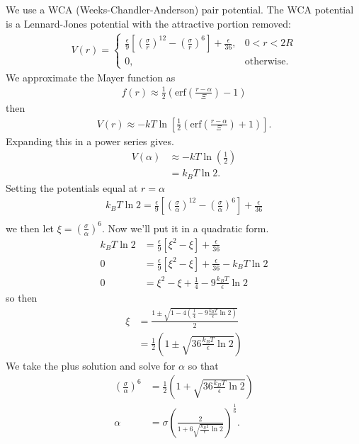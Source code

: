 \documentclass[letterpaper,twocolumn,amsmath,amssymb,prb]{revtex4-1}
\begin{document}
We use a WCA (Weeks-Chandler-Anderson) pair potential. The WCA
potential is a Lennard-Jones potential with the attractive portion removed:
\begin{align}
  V(r) =
  \begin{cases}
    \frac{\epsilon}{9} \left[ \left(\frac{\sigma}{r}\right)^{12} -
    \left(\frac{\sigma}{r}\right)^{6} \right] +
    \frac{\epsilon}{36}, & 0 < r < 2R \\
    0, & \textrm{otherwise}.
  \end{cases}
\end{align}
We approximate the Mayer function as
\begin{align}
  f(r) \approx \tfrac12 \left( \mathrm{erf}\left( \frac{r - \alpha}{\Xi} \right) - 1 \right)
\end{align}
then
\begin{align}
  V(r) \approx -kT\ln\left[\tfrac12 \left( \mathrm{erf}\left( \frac{r -
    \alpha}{\Xi} \right) + 1 \right) \right].
\end{align}
Expanding this in a power series gives.
\begin{align}
  V(\alpha) &\approx -kT\ln\left(\tfrac12\right) \\
  &= k_BT \ln 2.
\end{align}
Setting the potentials equal at $r=\alpha$
\begin{align}
  k_BT \ln 2 = \frac{\epsilon}{9} \left[ \left(\frac{\sigma}{\alpha}\right)^{12} -
    \left(\frac{\sigma}{\alpha}\right)^{6} \right] +
    \frac{\epsilon}{36} \\
\end{align}
we then let $\xi = \left(\frac{\sigma}{\alpha}\right)^6$. Now we'll put it in a
quadratic form.
\begin{align}
  k_BT \ln 2 &= \frac{\epsilon}{9} \left[ \xi^2 - \xi  \right] +
  \frac{\epsilon}{36} \\
  0 &= \frac{\epsilon}{9} \left[ \xi^2 - \xi  \right] + \frac{\epsilon}{36} -
  k_BT \ln 2 \\
  0 &= \xi^2 - \xi + \frac{1}{4} - 9\frac{k_BT}{\epsilon} \ln 2
\end{align}
so then
\begin{align}
  \xi &= \frac{1\pm \sqrt{1-4 \left( \frac{1}{4} - 9 \frac{k_BT}{\epsilon}
    \ln 2 \right)}}{2} \\
  &= \frac{1}{2}\left(1 \pm \sqrt{36 \frac{k_BT}{\epsilon} \ln 2} \right)
\end{align}
We take the plus solution and solve for $\alpha$ so that
\begin{align}
  \left(\frac{\sigma}{\alpha}\right)^6 &= \frac{1}{2}\left(1 +
  \sqrt{36 \frac{k_BT}{\epsilon} \ln 2} \right) \\
  \alpha &= \sigma \left( \frac{2}{1 + 6\sqrt{\frac{k_BT}{\epsilon}
        \ln 2}} \right)^{\frac{1}{6}}.
\end{align}
\end{document}
